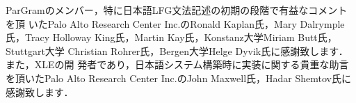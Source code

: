 \acknowledgment

{\normalsize
ParGramのメンバー，特に日本語LFG文法記述の初期の段階で有益なコメントを頂
いたPalo Alto Research Center Inc.のRonald Kaplan氏，Mary Dalrymple氏，Tracy
Holloway King氏，Martin Kay氏，Konstanz大学Miriam Butt氏，Stuttgart大学
Christian Rohrer氏，Bergen大学Helge Dyvik氏に感謝致します．また，XLEの開
発者であり，日本語システム構築時に実装に関する貴重な助言を頂いたPalo
Alto Research Center Inc.のJohn Maxwell氏，Hadar Shemtov氏に感謝致します．}
\vspace{-0.5cm}


\begin{biography}


\end{biography}

